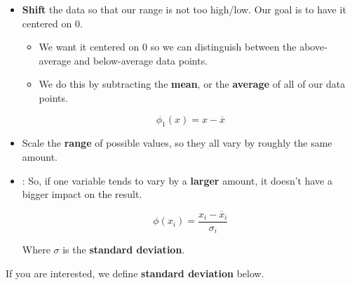                 \begin{itemize}
                    \item \textbf{Shift} the data so that our range is not too high/low. Our goal is to have it centered on 0.
                        \begin{itemize}
                            \item We want it centered on 0 so we can distinguish between the above-average and below-average data points.
                                
                            \item We do this by subtracting the \textbf{mean}, or the \textbf{average} of all of our data points.
                        \end{itemize}
                        
                    \begin{equation}
                        \phi_1(x) = x - \overline{x}
                    \end{equation}

                    \item Scale the \textbf{range} of possible values, so they all vary by roughly the same amount.
                    
                    \item: So, if one variable tends to vary by a \textbf{larger} amount, it doesn't have a bigger impact on the result.

                    \begin{equation}
                        \phi(x_i) = \frac{x_i - \overline{x}_i}{\sigma_i}
                    \end{equation}

                    Where $\sigma$ is the \textbf{standard deviation}.
                \end{itemize}

                If you are interested, we define \textbf{standard deviation} below.\\

